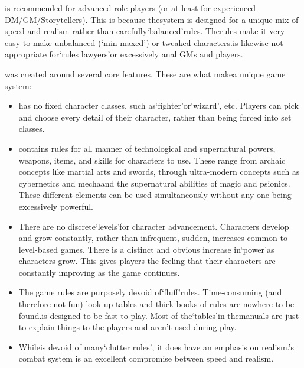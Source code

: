 \documentclass[twoside]{book}
\begin{document}
    {  
    \APATHY{}is recommended for advanced role-players (or at least for experienced DM/GM/Storytellers). This is because the\APATHY{}system is designed for a unique mix of speed and realism rather than carefully`balanced'rules. The\APATHY{}rules make it very easy to make unbalanced (`min-maxed') or tweaked characters.\APATHY{}is likewise not appropriate for`rules lawyers'or excessively anal GMs and players.
    }
  
    {  
    \APATHY{}was created around several core features. These are what make\APATHY{}a unique game system:
    }
  
\begin{itemize}
      
  \item 
    {  
    \APATHY{}has no fixed character classes, such as`fighter'or`wizard', etc. Players can pick and choose every detail of their character, rather than being forced into set classes.
    }
  
  \item 
    {  
    \APATHY{}contains rules for all manner of technological and supernatural powers, weapons, items, and skills for characters to use. These range from archaic concepts like martial arts and swords, through ultra-modern concepts such as cybernetics and mechaand the supernatural abilities of magic and psionics. These different elements can be used simultaneously without any one being excessively powerful.
    }
  
  \item 
    {  
    There are no discrete`levels'for character advancement. Characters develop and grow constantly, rather than infrequent, sudden, increases common to level-based games. There is a distinct and obvious increase in`power'as characters grow. This gives players the feeling that their characters are constantly improving as the game continues.
    }
  
  \item 
    {  
    The game rules are purposely devoid of`fluff'rules. Time-consuming (and therefore not fun) look-up tables and thick books of rules are nowhere to be found.\APATHY{}is designed to be fast to play. Most of the`tables'in the\APATHY{}manuals are just to explain things to the players and aren't used during play.
    }
  
  \item 
    {  
    While\APATHY{}is devoid of many`clutter rules', it does have an emphasis on realism.\APATHY{}'s combat system is an excellent compromise between speed and realism.
    }
  
\end{itemize}
  
\end{document}
